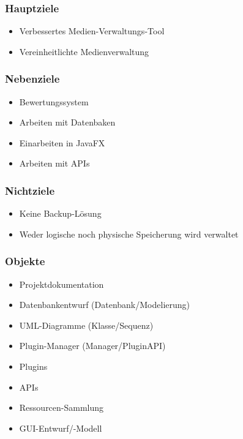 \subsubsection{Hauptziele}

\begin{itemize}
	\item Verbessertes Medien-Verwaltungs-Tool
	\item Vereinheitlichte Medienverwaltung
\end{itemize}
\subsubsection{Nebenziele}
\begin{itemize}
	\item Bewertungssystem
	\item Arbeiten mit Datenbaken
	\item Einarbeiten in JavaFX
	\item Arbeiten mit APIs
\end{itemize}
\subsubsection{Nichtziele}
\begin{itemize}
	\item Keine Backup-Lösung
	\item Weder logische noch physische Speicherung wird verwaltet
\end{itemize}
\subsubsection{Objekte}
\begin{itemize}
	\item Projektdokumentation
	\item Datenbankentwurf (Datenbank/Modelierung)
	\item UML-Diagramme (Klasse/Sequenz)
	\item Plugin-Manager (Manager/PluginAPI)
	\item Plugins
	\item APIs
	\item Ressourcen-Sammlung
	\item GUI-Entwurf/-Modell
\end{itemize}
